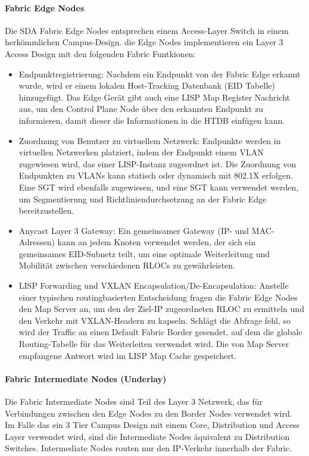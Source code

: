 \paragraph{Fabric Edge Nodes}
Die SDA Fabric Edge Nodes entsprechen einem Access-Layer Switch in einem herkömmlichen Campus-Design. die Edge Nodes implementieren ein Layer 3 Access Design mit den folgenden Fabric Funtkionen: \cite{sda-designguide}
\begin{itemize}	
	\item Endpunktregistrierung: Nachdem ein Endpunkt von der Fabric Edge erkannt wurde, wird er einem lokalen Host-Tracking Datenbank (EID Tabelle) hinzugefügt. Das Edge Gerät gibt auch eine LISP Map Register Nachricht aus, um den Control Plane Node über den erkannten Endpunkt zu informieren, damit dieser die Informationen in die HTDB einfügen kann.
	\item Zuordnung von Benutzer zu virtuellem Netzwerk: Endpunkte werden in virtuellen Netzwerken platziert, indem der Endpunkt einem VLAN zugewiesen wird, das einer LISP-Instanz zugeordnet ist. Die Zuordnung von Endpunkten zu VLANs kann statisch oder dynamisch mit 802.1X erfolgen. Eine SGT wird ebenfalls zugewiesen, und eine SGT kann verwendet werden, um Segmentierung und Richtliniendurchsetzung an der Fabric Edge bereitzustellen.
	\item Anycast Layer 3 Gateway: Ein gemeinsamer Gateway (IP- und MAC-Adressen) kann an jedem Knoten verwendet werden, der sich ein gemeinsames EID-Subnetz teilt, um eine optimale Weiterleitung und Mobilität zwischen verschiedenen RLOCs zu gewährleisten.
	\item LISP Forwarding und VXLAN Encapsulation/De-Encapsulation: Anstelle einer typischen routingbasierten Entscheidung fragen die Fabric Edge Nodes den Map Server an, um den der Ziel-IP zugeordneten RLOC zu ermitteln und den Verkehr mit VXLAN-Headern zu kapseln. Schlägt die Abfrage fehl, so wird der Traffic an einen Default Fabric Border gesendet, auf dem die globale Routing-Tabelle für das Weiterleiten verwendet wird. Die von Map Server empfangene Antwort wird im LISP Map Cache gespeichert. 
\end{itemize} 

\paragraph{Fabric Intermediate Nodes (Underlay)}
Die Fabric Intermediate Nodes sind Teil des Layer 3 Netzwerk, das für Verbindungen zwischen den Edge Nodes zu den Border Nodes verwendet wird. Im Falle das ein 3 Tier Campus Design mit einem Core, Distribution und Access Layer verwendet wird, sind die  Intermediate Nodes äquivalent zu Distribution Switches. Intermediate Nodes routen nur den IP-Verkehr innerhalb der Fabric. \cite{sda-designguide}

